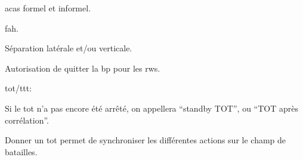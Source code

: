 \begin{e1}
\begin{e2}
\begin{e3}
\begin{e4}
			\end{e4}
			
		\end{e3}
		
		
		\begin{e3}
			
			\item \glspl{aca} formel et informel.
			\item \gls{fah}.
			\item Séparation latérale et/ou verticale.
			\item Autorisation de quitter la \gls{bp} pour les \glspl{rw}.
			\item \gls{tot}/\gls{ttt}:
			\begin{e4}
				
				\item Si le \gls{tot} n'a pas encore été arrêté, on appellera ``standby TOT'', ou ``TOT après corrélation''.
				
				\item Donner un \gls{tot} permet de synchroniser les différentes actions sur le champ de batailles.
				
				
			\end{e4}
			
		\end{e3}
		
	\end{e2}
		
\end{e1}